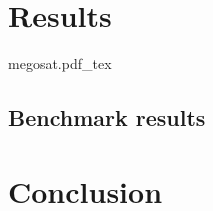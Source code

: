 \chapter{Results}
\label{ch:results}
%
\vspace{50pt}
\begin{center}
  \def\svgwidth{100pt}
  {megosat.pdf_tex}
\end{center}

\section{Benchmark results}

\chapter{Conclusion}
\label{ch:conclusion}






